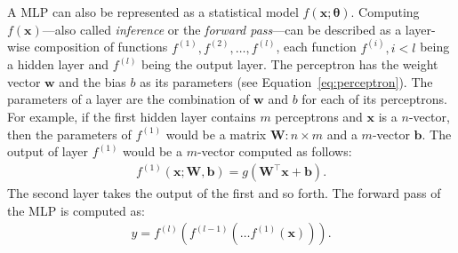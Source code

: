 \documentclass[]{article}
\begin{document}
A MLP can also be represented as a statistical model
$f(\mathbf{x};\mathbf{\theta})$.
Computing $f(\mathbf{x})$---also called \textit{inference} or the
\textit{forward pass}---can be described as a layer-wise composition
of functions $f^{(1)}, f^{(2)}, \dots, f^{(l)}$, each function
$f^{(i)}, i < l$ being a hidden layer and $f^{(l)}$ being the output
layer.
The perceptron has the weight vector $\mathbf{w}$ and the bias
$b$ as its parameters (see Equation~\ref{eq:perceptron}).
The parameters of a layer are the combination of
$\mathbf{w}$ and $b$ for each of its perceptrons.
For example, if the first hidden layer contains $m$ perceptrons and
$\mathbf{x}$ is a $n$-vector, then the parameters of $f^{(1)}$ would
be a matrix $\mathbf{W}: n \times m$ and a $m$-vector $\mathbf{b}$.
The output of layer $f^{(1)}$ would be a $m$-vector computed as
follows:
\begin{align}
  f^{(1)}(\mathbf{x}; \mathbf{W}, \mathbf{b}) =
  g(\mathbf{W}^\top\mathbf{x} + \mathbf{b}).
\end{align}
The second layer takes the output of the first and so forth.
The forward pass of the MLP is computed as:
\begin{align}
  y = f^{(l)}(f^{(l-1)}(\dots f^{(1)}(\mathbf{x}))).
\end{align}
\end{document}
